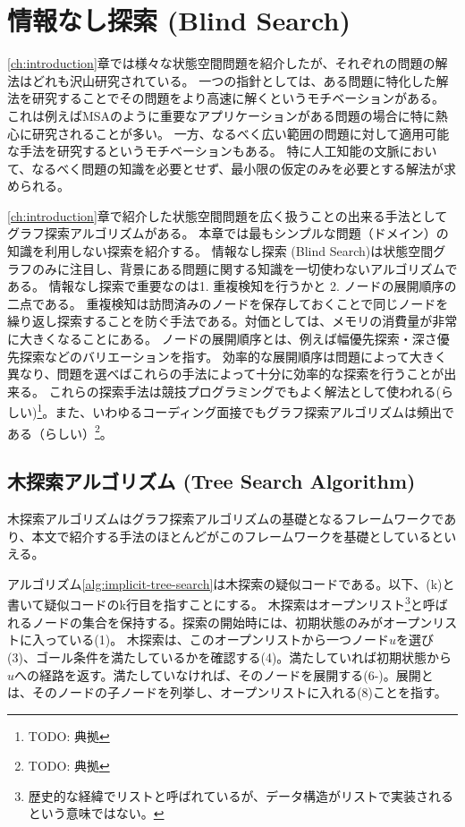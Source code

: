 \documentclass{report}
\begin{document}
\chapter{情報なし探索 (Blind Search)}
\label{ch:blind-search}

\ref{ch:introduction}章では様々な状態空間問題を紹介したが、それぞれの問題の解法はどれも沢山研究されている。
一つの指針としては、ある問題に特化した解法を研究することでその問題をより高速に解くというモチベーションがある。
これは例えばMSAのように重要なアプリケーションがある問題の場合に特に熱心に研究されることが多い。
一方、なるべく広い範囲の問題に対して適用可能な手法を研究するというモチベーションもある。
特に人工知能の文脈において、なるべく問題の知識を必要とせず、最小限の仮定のみを必要とする解法が求められる。

\ref{ch:introduction}章で紹介した状態空間問題を広く扱うことの出来る手法としてグラフ探索アルゴリズムがある。
本章では最もシンプルな問題（ドメイン）の知識を利用しない探索を紹介する。
情報なし探索 (Blind Search)は状態空間グラフのみに注目し、背景にある問題に関する知識を一切使わないアルゴリズムである。
情報なし探索で重要なのは1. 重複検知を行うかと 2. ノードの展開順序の二点である。
重複検知は訪問済みのノードを保存しておくことで同じノードを繰り返し探索することを防ぐ手法である。対価としては、メモリの消費量が非常に大きくなることにある。
ノードの展開順序とは、例えば幅優先探索・深さ優先探索などのバリエーションを指す。
効率的な展開順序は問題によって大きく異なり、問題を選べばこれらの手法によって十分に効率的な探索を行うことが出来る。
これらの探索手法は競技プログラミングでもよく解法として使われる(らしい)\footnote{TODO: 典拠}。また、いわゆるコーディング面接でもグラフ探索アルゴリズムは頻出である（らしい）\footnote{TODO: 典拠}。



\section{木探索アルゴリズム (Tree Search Algorithm)}
\label{sec:tree-search-algorithm}
木探索アルゴリズムはグラフ探索アルゴリズムの基礎となるフレームワークであり、本文で紹介する手法のほとんどがこのフレームワークを基礎としているといえる。

アルゴリズム\ref{alg:implicit-tree-search}は木探索の疑似コードである。以下、(k)と書いて疑似コードのk行目を指すことにする。
木探索はオープンリスト\footnote{歴史的な経緯でリストと呼ばれているが、データ構造がリストで実装されるという意味ではない。}と呼ばれるノードの集合を保持する。探索の開始時には、初期状態のみがオープンリストに入っている(1)。
木探索は、このオープンリストから一つノード$u$を選び(3)、ゴール条件を満たしているかを確認する(4)。満たしていれば初期状態から$u$への経路を返す。満たしていなければ、そのノードを展開する(6-)。展開とは、そのノードの子ノードを列挙し、オープンリストに入れる(8)ことを指す。
\end{document}
